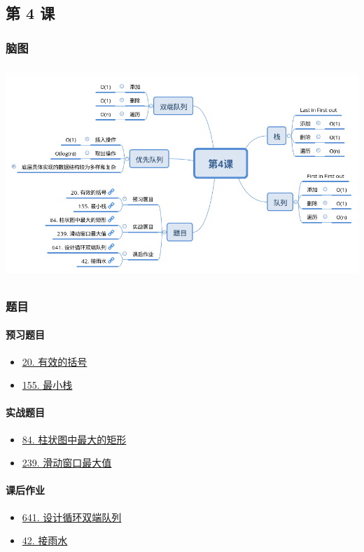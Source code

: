 \subsection{第 4 课}

\subsubsection{脑图}

\includegraphics[width=170mm,height=80mm]{images/第4课.png}

\subsubsection{题目}

\paragraph{预习题目}

\begin{itemize}
  \item \hyperref[leetcode:20]{20. 有效的括号}
  \item \hyperref[leetcode:155]{155. 最小栈}
\end{itemize}

\paragraph{实战题目}

\begin{itemize}
  \item \hyperref[leetcode:84]{84. 柱状图中最大的矩形}
  \item \hyperref[leetcode:239]{239. 滑动窗口最大值}
\end{itemize}

\paragraph{课后作业}

\begin{itemize}
  \item \hyperref[leetcode:641]{641. 设计循环双端队列}
  \item \hyperref[leetcode:42]{42. 接雨水}
\end{itemize}
